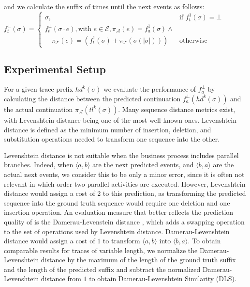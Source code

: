 \documentclass[runningheads,a4paper]{llncs}
\begin{document}
\noindent and we calculate the suffix of times until the next events as follows:\\

\noindent$f_{t}^\bot(\sigma)= \begin{cases}
\sigma, & \mbox{if } f_{t}^1(\sigma)=\bot\\
f_{t}^\bot(\sigma\cdot e), \text{with } e\in\mathcal{E},\pi_\mathcal{A}(e)=f_a^1(\sigma)\land\\\quad\pi_\mathcal{T}(e)=(f_t^1(\sigma)+\pi_\mathcal{T}(\sigma(|\sigma|))) & \mbox{otherwise}
\end{cases}$


\subsection{Experimental Setup}
For a given trace prefix $\mathit{hd}^k(\sigma)$ we evaluate the performance of $f_a^\bot$ by calculating the distance between the predicted continuation $f_a^\bot(\mathit{hd}^k(\sigma))$ and the actual continuation $\pi_\mathcal{A}(\mathit{tl}^k(\sigma))$. Many sequence distance metrics exist, with Levenshtein distance  being one of the most well-known ones. Levenshtein distance is defined as the minimum number of insertion, deletion, and substitution operations needed to transform one sequence into the other. 

Levenshtein distance is not suitable when the business process includes parallel branches. Indeed, when $\langle a,b \rangle$ are the next predicted events, and $\langle b, a \rangle$ are the actual next events, we consider this to be only a minor error, since it is often not relevant in which order two parallel activities are executed. However, Levenshtein distance would assign a cost of $2$ to this prediction, as transforming the predicted sequence into the ground truth sequence would require one deletion and one insertion operation. An evaluation measure that better reflects the prediction quality of is the Damerau-Levenstein distance \cite{Damerau1964}, which adds a swapping operation to the set of operations used by Levenshtein distance. Damerau-Levenshtein distance would assign a cost of $1$ to transform $\langle a,b\rangle$ into $\langle b,a\rangle$. To obtain comparable results for traces of variable length, we normalize the Damerau-Levenshtein distance by the maximum of the length of the ground truth suffix and the length of the predicted suffix and subtract the normalized Damerau-Levenshtein distance from $1$ to obtain Damerau-Levenshtein Similarity (DLS).
\end{document}
